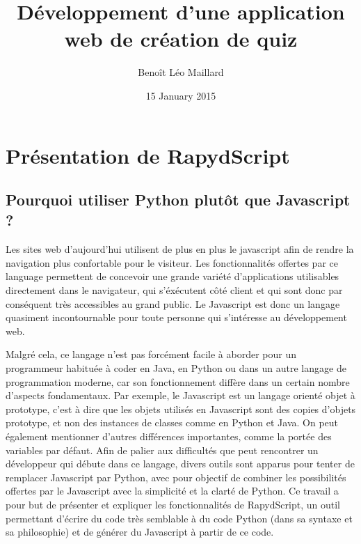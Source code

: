 \documentclass[letterpaper,10pt,french]{sphinxmanual}
\title{Développement d'une application web de création de quiz}
\date{15 January 2015}
\author{Benoît Léo Maillard}
\begin{document}
\maketitle
\tableofcontents
{}\label{index::doc}



\chapter{Présentation de RapydScript}
\label{rapydscript:presentation-de-rapydscript}\label{rapydscript::doc}\label{rapydscript:application-de-creation-de-quiz}

\section{Pourquoi utiliser Python plutôt que Javascript ?}
\label{rapydscript:pourquoi-utiliser-python-plutot-que-javascript}
Les sites web d'aujourd'hui utilisent de plus en plus le javascript afin de rendre la navigation plus confortable pour le visiteur. Les fonctionnalités offertes par ce language permettent de concevoir une grande variété d'applications utilisables directement dans le navigateur, qui s'éxécutent côté client et qui sont donc par conséquent très accessibles au grand public. Le Javascript est donc un langage quasiment incontournable pour toute personne qui s'intéresse au développement web.

Malgré cela, ce langage n'est pas forcément facile à aborder pour un programmeur habituée à coder en Java, en Python ou dans un autre langage de programmation moderne, car son fonctionnement diffère dans un certain nombre d'aspects fondamentaux. Par exemple, le Javascript est un langage orienté objet à prototype, c'est à dire que les objets utilisés en Javascript sont des copies d'objets prototype, et non des instances de classes comme en Python et Java. On peut également mentionner d'autres différences importantes, comme la portée des variables par défaut. Afin de palier aux difficultés que peut rencontrer un développeur qui débute dans ce langage, divers outils sont apparus pour tenter de remplacer Javascript par Python, avec pour objectif de combiner les possibilités offertes par le Javascript avec la simplicité et la clarté de Python. Ce travail a pour but de présenter et expliquer les fonctionnalités de RapydScript, un outil permettant d'écrire du code très semblable à du code Python (dans sa syntaxe et sa philosophie) et de générer du Javascript à partir de ce code.
\end{document}
